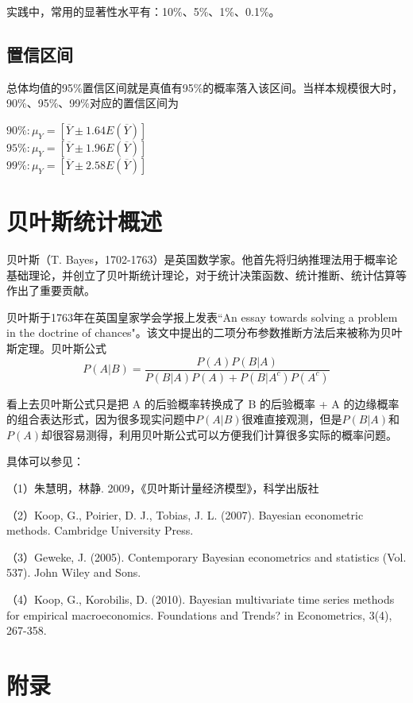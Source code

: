 \documentclass[cn,12pt,math=newtx,citestyle=gb7714-2015,bibstyle=gb7714-2015]{elegantbook}
\begin{document}
	实践中，常用的显著性水平有：10\%、5\%、1\%、0.1\%。
	
	\subsection{置信区间}
	
	总体均值的95\%置信区间就是真值有95\%的概率落入该区间。当样本规模很大时，90\%、95\%、99\%对应的置信区间为
	\begin{center}
		$90\%:\mu_Y=[\overline{Y}\pm{1.64E(\overline{Y})}]$\\
		$95\%:\mu_Y=[\overline{Y}\pm{1.96E(\overline{Y})}]$\\
		$99\%:\mu_Y=[\overline{Y}\pm{2.58E(\overline{Y})}]$
	\end{center}
	
	\section{贝叶斯统计概述}
	贝叶斯（T. Bayes，1702-1763）是英国数学家。他首先将归纳推理法用于概率论基础理论，并创立了贝叶斯统计理论，对于统计决策函数、统计推断、统计估算等作出了重要贡献。
	
	贝叶斯于1763年在英国皇家学会学报上发表“An essay towards solving a problem in the doctrine of chances"。该文中提出的二项分布参数推断方法后来被称为贝叶斯定理。贝叶斯公式
	\begin{equation}
		P(A|B)=\frac{P(A)P(B|A)}{P(B|A)P(A)+P(B|A^c)P(A^c)}
	\end{equation}
	
	看上去贝叶斯公式只是把 A 的后验概率转换成了 B 的后验概率 + A 的边缘概率的组合表达形式，因为很多现实问题中$P(A|B)$很难直接观测，但是$P(B|A)$和$P(A)$却很容易测得，利用贝叶斯公式可以方便我们计算很多实际的概率问题。
	
	具体可以参见：
	
	（1）朱慧明，林静. 2009，《贝叶斯计量经济模型》，科学出版社
	
	（2）Koop, G., Poirier, D. J.,  Tobias, J. L. (2007). Bayesian econometric methods. Cambridge University Press.
	
	（3）Geweke, J. (2005). Contemporary Bayesian econometrics and statistics (Vol. 537). John Wiley and Sons.
	
	（4）Koop, G.,  Korobilis, D. (2010). Bayesian multivariate time series methods for empirical macroeconomics. Foundations and Trends? in Econometrics, 3(4), 267-358.
	
	
	
	\section{附录}
	
\end{document}
